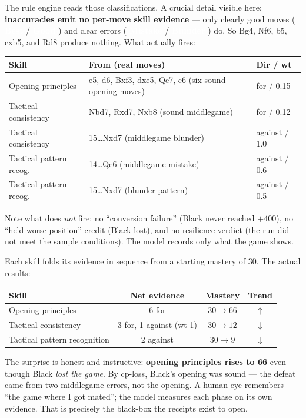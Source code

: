 \documentclass[11pt]{article}
\newcommand{\chip}[2]{\,\colorbox{#1}{\textcolor{white}{\sffamily\bfseries\footnotesize\,#2\,}}\,}
\newcommand{\best}{\chip{forestlt}{Best}}
\newcommand{\good}{\chip{forest}{Good}}
\newcommand{\mistake}{\chip{walnutmid}{Mistake}}
\newcommand{\blun}{\chip{blunder}{Blunder}}
\begin{document}
\begin{playbox}
The rule engine reads those classifications. A crucial detail visible here:
\textbf{inaccuracies emit no per-move skill evidence} --- only clearly good
moves (\best/\good) and clear errors (\mistake/\blun) do. So Bg4, Nf6, b5, cxb5,
and Rd8 produce nothing. What actually fires:

\begin{center}
\tabnum
\begin{tabularx}{\linewidth}{@{}l Y l@{}}
\toprule
\textbf{Skill} & \textbf{From (real moves)} & \textbf{Dir / wt} \\
\midrule
Opening principles & e5, d6, Bxf3, dxe5, Qe7, c6 (six sound opening moves) & for / 0.15 \\
Tactical consistency & Nbd7, Rxd7, Nxb8 (sound middlegame) & for / 0.12 \\
Tactical consistency & 15\dots Nxd7 (middlegame blunder) & against / 1.0 \\
Tactical pattern recog. & 14\dots Qe6 (middlegame mistake) & against / 0.6 \\
Tactical pattern recog. & 15\dots Nxd7 (blunder pattern) & against / 0.5 \\
\bottomrule
\end{tabularx}
\end{center}

Note what does \emph{not} fire: no ``conversion failure'' (Black never reached
$+400$), no ``held-worse-position'' credit (Black lost), and no resilience
verdict (the run did not meet the sample conditions). The model records only
what the game shows.
\end{playbox}

\begin{playbox}
Each skill folds its evidence in sequence from a starting mastery of 30. The
actual results:

\begin{center}
\tabnum
\begin{tabularx}{\linewidth}{@{}Y c c c@{}}
\toprule
\textbf{Skill} & \textbf{Net evidence} & \textbf{Mastery} & \textbf{Trend} \\
\midrule
Opening principles & 6 for & $30 \to 66$ & $\uparrow$ \\
Tactical consistency & 3 for, 1 against (wt 1) & $30 \to 12$ & $\downarrow$ \\
Tactical pattern recognition & 2 against & $30 \to 9$ & $\downarrow$ \\
\bottomrule
\end{tabularx}
\end{center}

The surprise is honest and instructive: \textbf{opening principles rises to 66}
even though Black \emph{lost the game}. By cp-loss, Black's opening was sound ---
the defeat came from two middlegame errors, not the opening. A human eye
remembers ``the game where I got mated''; the model measures each phase on its
own evidence. That is precisely the black-box the receipts exist to open.
\end{playbox}
\end{document}
